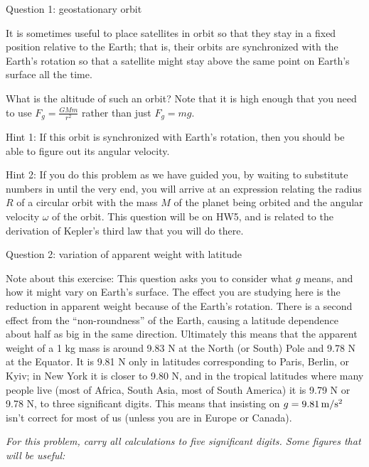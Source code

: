 \documentclass[12pt]{article}
\begin{document}
\Large
\centerline{}
\normalsize
\centerline{}

\medskip


\centerline{\Large Question 1: geostationary orbit}

It is sometimes useful to place satellites in orbit so that they stay in a fixed position relative to the
Earth; that is, their orbits are synchronized with the Earth's rotation so that a satellite might stay
above the same point on Earth’s surface all the time.

What is the altitude of such an orbit? Note that it is high enough that you need to use $F_g=\frac{GMm}{r^2}$
rather than just $F_g = mg$.

{\sc Hint 1:} If this orbit is synchronized with Earth's rotation, then you should be able to figure out its
angular velocity.

{\sc Hint 2:} If you do this problem as we have guided you, by waiting to substitute numbers in until the 
very end, you will arrive at an expression relating the radius $R$ of a circular orbit with the mass $M$ of the 
planet being orbited and the angular velocity $\omega$ of the orbit. This question will be on HW5, and is related
to the derivation of Kepler's third law that you will do there.

\newpage

\centerline{\Large Question 2: variation of apparent weight with latitude}

\medskip

{\footnotesize Note about this exercise: This question asks you to consider what $g$ means, and how it might vary on Earth's surface. The effect you are studying here is the reduction in apparent weight because of the Earth's rotation. There is a second effect from the ``non-roundness'' of the Earth, causing a latitude dependence about half as big in the same direction. Ultimately this means that the apparent weight of a 1 kg mass is around 9.83 N at the North (or South) Pole and 9.78 N at the Equator. It is 9.81 N only in latitudes corresponding to Paris, Berlin, or Kyiv; in New York it is closer to 9.80 N, and in the tropical latitudes where many people live (most of Africa, South Asia, most of South America) it is 9.79 N or 9.78 N, to three significant digits. This means that insisting on $g=9.81\,\rm m/\rm s^2$ isn't correct for most of us (unless you are in Europe or Canada).
}


\it For this problem, carry all calculations to five significant digits. Some figures that will be useful:
\end{document}
